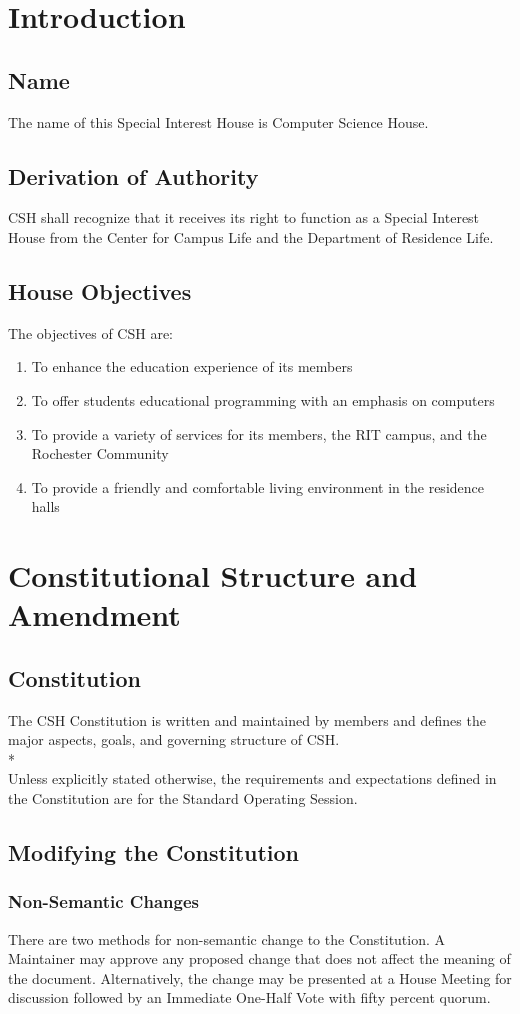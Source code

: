 \documentclass{article}
\newcommand{\article}[1]{\section{#1} \label{#1}}
\newcommand{\asection}[1]{\subsection{#1} \label{#1}}
\newcommand{\asubsection}[1]{\subsubsection{#1} \label{#1}}
\begin{document}
\article{Introduction}

\asection{Name}
The name of this Special Interest House is Computer Science House.

\asection{Derivation of Authority}
CSH shall recognize that it receives its right to function as a Special Interest House from the Center for Campus Life and the Department of Residence Life.

\asection{House Objectives}
The objectives of CSH are:
\begin{enumerate}
	\item To enhance the education experience of its members
	\item To offer students educational programming with an emphasis on computers
	\item To provide a variety of services for its members, the RIT campus, and the Rochester Community
	\item To provide a friendly and comfortable living environment in the residence halls
\end{enumerate}

\article{Constitutional Structure and Amendment}

\asection{Constitution}
The CSH Constitution is written and maintained by members and defines the major aspects, goals, and governing structure of CSH.
\\*\\
Unless explicitly stated otherwise, the requirements and expectations defined in the Constitution are for the Standard Operating Session.

\subsection{Modifying the Constitution}
\asubsection{Non-Semantic Changes}
There are two methods for non-semantic change to the Constitution.
A Maintainer may approve any proposed change that does not affect the meaning of the document.
Alternatively, the change may be presented at a House Meeting for discussion followed by an Immediate One-Half Vote with fifty percent quorum.
\end{document}
